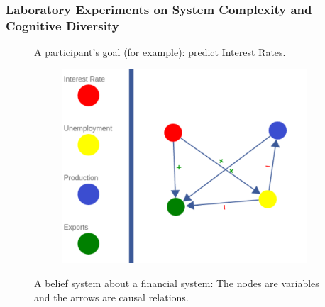 \documentclass{beamer}
\begin{document}
\begin{frame}
\frametitle{Laboratory Experiments on System Complexity and Cognitive Diversity}
\small
\begin{figure}
A participant's goal (for example): predict Interest Rates. 
        \centering
        \begin{subfigure}[b]{0.5\textwidth}
                \includegraphics[width=\textwidth]{Complex.pdf}
                
        \end{subfigure}%
       \caption{A belief system about a financial system: The nodes are variables and the arrows are causal relations.}
\end{figure}

\end{frame}
\end{document}
